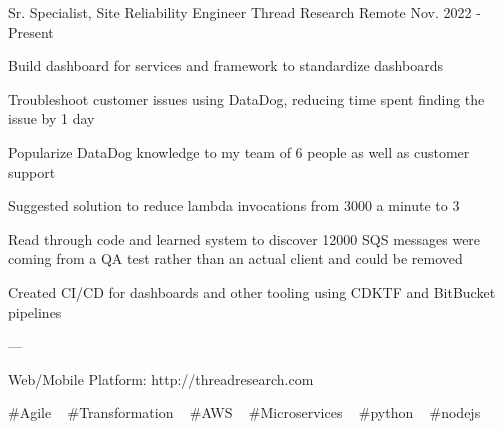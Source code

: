 

\begin{cventries}

  \cventry
    {Sr. Specialist, Site Reliability Engineer} %
    {Thread Research} %
    {Remote} %
    {Nov. 2022 - Present} %
    {
      \begin{cvitems} %
        \item {Build dashboard for services and framework to standardize dashboards}
        \item {Troubleshoot customer issues using DataDog, reducing time spent finding the issue by 1 day}
        \item {Popularize DataDog knowledge to my team of 6 people as well as customer support}
        \item {Suggested solution to reduce lambda invocations from 3000 a minute to 3}
        \item {Read through code and learned system to discover 12000 SQS messages were coming from a QA test rather than an actual client and could be removed}
        \item {Created CI/CD for dashboards and other tooling using CDKTF and BitBucket pipelines}
        \item {---}
        \item {Web/Mobile Platform: http://threadresearch.com}
      \end{cvitems}
    }
    {
      \#Agile ~
      \#Transformation ~
      \#AWS ~
      \#Microservices ~
      \#python ~
      \#nodejs ~
    }


\end{cventries}
